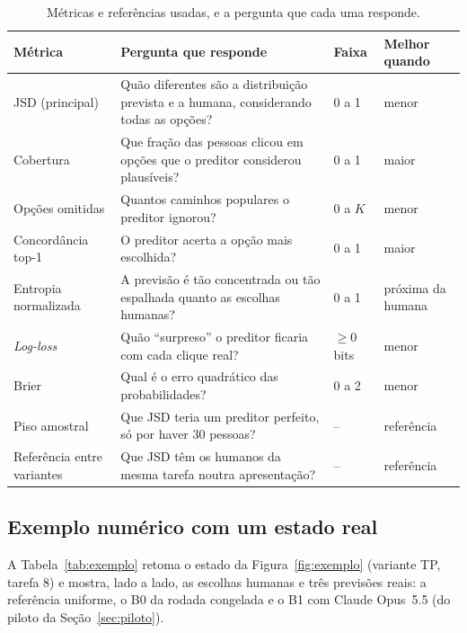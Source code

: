 \documentclass[12pt,oneside,a4paper,chapter=TITLE,english,brazil]{abntex2}
\begin{document}
\begin{table}[htb]
\centering
\caption{Métricas e referências usadas, e a pergunta que cada uma responde.}
\label{tab:metricas}
\footnotesize
\begin{tabularx}{\textwidth}{@{}p{3.4cm}Yp{1.5cm}p{2.5cm}@{}}
\toprule
\textbf{Métrica} & \textbf{Pergunta que responde} & \textbf{Faixa} & \textbf{Melhor quando} \\
\midrule
JSD (principal) & Quão diferentes são a distribuição prevista e a humana, considerando todas as opções? & 0 a 1 & menor \\
Cobertura & Que fração das pessoas clicou em opções que o preditor considerou plausíveis? & 0 a 1 & maior \\
Opções omitidas & Quantos caminhos populares o preditor ignorou? & 0 a $K$ & menor \\
Concordância top-1 & O preditor acerta a opção mais escolhida? & 0 a 1 & maior \\
Entropia normalizada & A previsão é tão concentrada ou tão espalhada quanto as escolhas humanas? & 0 a 1 & próxima da humana \\
\textit{Log-loss} & Quão ``surpreso'' o preditor ficaria com cada clique real? & $\ge 0$ bits & menor \\
Brier & Qual é o erro quadrático das probabilidades? & 0 a 2 & menor \\
\midrule
Piso amostral & Que JSD teria um preditor perfeito, só por haver 30 pessoas? & -- & referência \\
Referência entre variantes & Que JSD têm os humanos da mesma tarefa noutra apresentação? & -- & referência \\
\bottomrule
\end{tabularx}
\end{table}

\subsection{Exemplo numérico com um estado real}
\label{sec:exemplo}

\begin{real}
A Tabela~\ref{tab:exemplo} retoma o estado da Figura~\ref{fig:exemplo} (variante TP, tarefa 8) e mostra, lado a lado, as escolhas humanas e três previsões reais: a referência uniforme, o B0 da rodada congelada e o B1 com Claude Opus~5.5 (do piloto da Seção~\ref{sec:piloto}).
\end{real}
\end{document}
